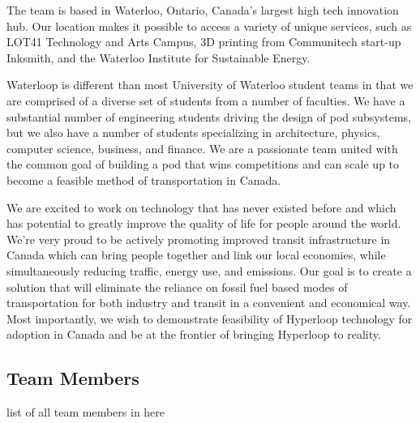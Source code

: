 \documentclass[11pt,a4paper,oldfontcommands]{memoir}
\begin{document}
The team is based in Waterloo, Ontario, Canada’s largest high tech innovation hub. Our location makes it possible to access a variety of unique services, such as LOT41 Technology and Arts Campus, 3D printing from Communitech start-up Inksmith, and the Waterloo Institute for Sustainable Energy.

Waterloop is different than most University of Waterloo student teams in that we are comprised of a diverse set of students from a number of faculties. We have a substantial number of engineering students driving the design of pod subsystems, but we also have a number of students specializing in architecture, physics, computer science, business, and finance. We are a passionate team united with the common goal of building a pod that wins competitions and can scale up to become a feasible method of transportation in Canada.

We are excited to work on technology that has never existed before and which has potential to greatly improve the quality of life for people around the world. We’re very proud to be actively promoting improved transit infrastructure in Canada which can bring people together and link our local economies, while simultaneously reducing traffic, energy use, and emissions. Our goal is to create a solution that will eliminate the reliance on fossil fuel based modes of transportation for both industry and transit in a convenient and economical way. Most importantly, we wish to demonstrate feasibility of Hyperloop technology for adoption in Canada and be at the frontier of bringing Hyperloop to reality.

\subsection{Team Members}
list of all team members in here
\end{document}
